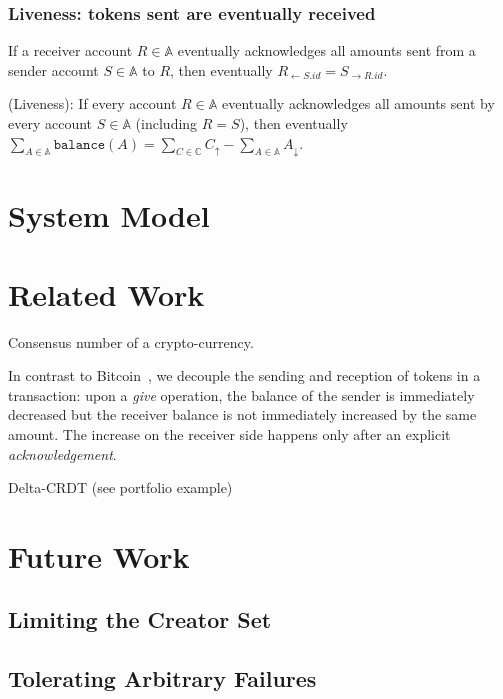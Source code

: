 \documentclass[9pt, oneside]{article}   	%
\begin{document}
\subsubsection{Liveness: tokens sent are eventually received}

If a receiver account $R \in \mathds{A}$ eventually acknowledges all amounts sent from a sender account $S \in \mathds{A}$ to $R$, then eventually $R_{\leftarrow S.id} = S_{\rightarrow R.id}$.

(Liveness): If every account $R \in \mathds{A}$ eventually acknowledges all amounts sent by every account $S \in \mathds{A}$ (including $R=S$), then eventually $\sum\limits_{A \in \mathds{A}} \texttt{balance}(A) = \sum\limits_{C \in \mathds{C}} C_\uparrow - \sum\limits_{A \in \mathds{A}} A_\downarrow$.

\section{System Model}




\section{Related Work}

Consensus number of a crypto-currency.

 In contrast to Bitcoin~\cite{bitcoin}, we decouple the sending and reception of tokens in a transaction: upon a \textit{give} operation, the balance of the sender is immediately decreased but the receiver balance is not immediately increased by the same amount.  The increase on the receiver side happens only  after an explicit \textit{acknowledgement}. 
 
Delta-CRDT (see portfolio example)~\cite{Almeida2018delta}
 
\section{Future Work}
 
\subsection{Limiting the Creator Set}

\subsection{Tolerating Arbitrary Failures}
\end{document}
